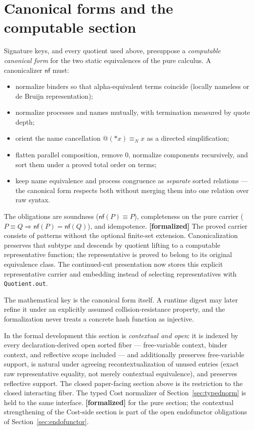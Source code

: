\documentclass[11pt]{article}
\newcommand{\code}[1]{\texttt{#1}}
\newcommand{\formalized}{\textbf{[formalized]}}
\begin{document}
\section{Canonical forms and the computable section}
\label{sec:canon}

Signature keys, and every quotient used above, presuppose a
\emph{computable canonical form} for the two static equivalences of the
pure calculus. A canonicalizer $\mathsf{nf}$ must:
\begin{itemize}
\item normalize binders so that alpha-equivalent terms coincide
  (locally nameless or de Bruijn representation);
\item normalize processes and names mutually, with termination measured
  by quote depth;
\item orient the name cancellation $@({*}x) \equiv_N x$ as a directed
  simplification;
\item flatten parallel composition, remove $0$, normalize components
  recursively, and sort them under a proved total order on terms;
\item keep name equivalence and process congruence as \emph{separate}
  sorted relations --- the canonical form respects both without merging
  them into one relation over raw syntax.
\end{itemize}
The obligations are soundness ($\mathsf{nf}(P) \equiv P$), completeness on
the pure carrier
($P \equiv Q \Rightarrow \mathsf{nf}(P) = \mathsf{nf}(Q)$), and
idempotence. \formalized{} The proved carrier consists of patterns without
the optional finite-set extension.  Canonicalization preserves that subtype
and descends by quotient lifting to a computable representative function; the
representative is proved to belong to its original equivalence class.  The
continued-cut presentation now stores this explicit representative carrier
and embedding instead of selecting representatives with
\code{Quotient.out}.

The mathematical key is the canonical form itself. A runtime digest may later
refine it under an explicitly assumed collision-resistance property, and the
formalization never treats a concrete hash function as injective.

In the formal development this section is \emph{contextual and open}: it is
indexed by every declaration-derived open sorted fiber --- free-variable
context, binder context, and reflective scope included --- and additionally
preserves free-variable support, is natural under agreeing recontextualization
of unused entries (exact raw representative equality, not merely contextual
equivalence), and preserves reflective support.  The closed paper-facing
section above is its restriction to the closed interacting fiber.  The typed
Cost normalizer of Section~\ref{sec:typednorm} is held to the same
interface. \formalized{} for the pure section; the contextual strengthening of
the Cost-side section is part of the open endofunctor obligations of
Section~\ref{sec:endofunctor}.
\end{document}
